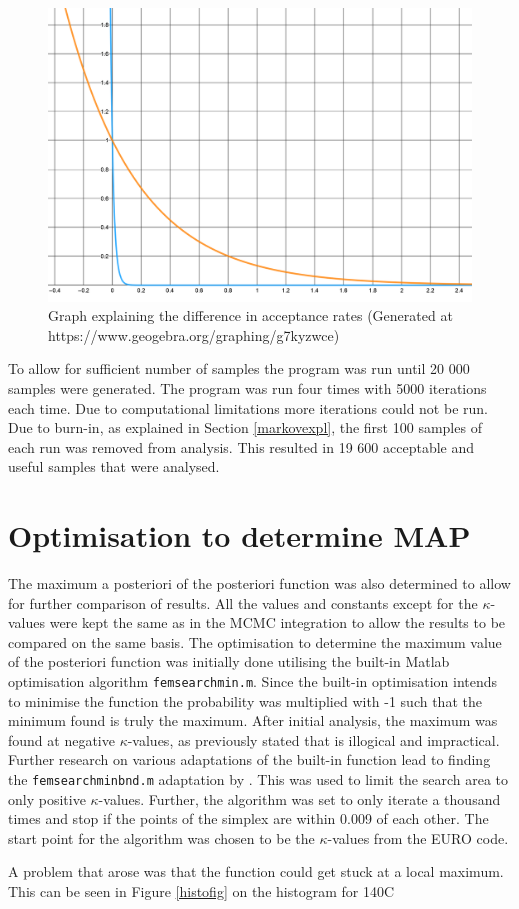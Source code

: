 	\begin{figure}[H]\label{expcurvefig}
	\centering
	\includegraphics[width = 0.5\linewidth]{figures/e_expl_curve.png}
	\caption{Graph explaining the difference in acceptance rates (Generated at https://www.geogebra.org/graphing/g7kyzwce)}
	\end{figure}
	
	To allow for sufficient number of samples the program was run until 20 000 samples were generated.
	The program was run four times with 5000 iterations each time. 
	Due to computational limitations more iterations could not be run.
	Due to burn-in, as explained in Section \ref{markovexpl}, the first 100 samples of each run was removed from analysis. 
	This resulted in 19 600 acceptable and useful samples that were analysed.
	
	
	
	\section{Optimisation to determine MAP}
The maximum a posteriori of the posteriori function was also determined to allow for further comparison of results.
All the values and constants except for the $\kappa$-values were kept the same as in the MCMC integration to allow the results to be compared on the same basis.  
	The optimisation to determine the maximum value of the posteriori function was initially done utilising the built-in Matlab optimisation algorithm \texttt{femsearchmin.m}. 
	Since the built-in optimisation intends to minimise the function the probability was multiplied with -1 such that the minimum found is truly the maximum.
	After initial analysis, the maximum was found at negative $\kappa$-values, as previously stated that is illogical and impractical.
	Further research on various adaptations of the built-in function lead to finding the \texttt{femsearchminbnd.m} adaptation by \citet{derrico:2021}. 
	This was used to limit the search area to only positive $\kappa$-values.
	Further, the algorithm was set to only iterate a thousand times and stop if the points of the simplex are within 0.009 of each other.
	The start point for the algorithm was chosen to be the $\kappa$-values from the EURO code.
	
	A problem that arose was that the function could get stuck at a local maximum.
	This can be seen in Figure \ref{histofig} on the histogram for 140\textdegree C
	
	

